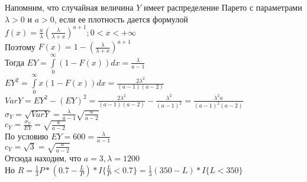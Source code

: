 \documentclass{article}
\begin{document}
Напомним, что случайная величина $Y$ имеет распределение Парето с параметрами $\lambda > 0$ и $a>0$, если ее плотность дается формулой\\

$f(x) = \frac{a}{\lambda} (\frac{\lambda}{\lambda+x})^{a+1}; 0<x< +\infty$\\

Поэтому $F(x) = 1 - (\frac{\lambda}{\lambda+x})^{a+1}$\\

Тогда $EY= \int\limits_{0}^{\infty} (1-F(x))dx = \frac{\lambda}{a-1}$\\

$EY^2= \int\limits_{0}^{\infty} x(1-F(x))dx = \frac{2\lambda^2}{(a-1)(a-2)}$\\

$VarY = EY^2-(EY)^2 = \frac{2\lambda^2}{(a-1)(a-2)} -  \frac{\lambda^2}{(a-1)^2} = \frac{\lambda^2 a }{(a-1)^2(a-2)} $\\

$\sigma_Y = \sqrt{VarY}=  \frac{\lambda}{a-1} \sqrt{ \frac{a}{a-2}} $\\

$c_Y = \frac {\sigma_Y}{EY} = \sqrt{  \frac{a}{a-2}}$\\

По условию $EY= 600=  \frac{\lambda}{a-1}$\\
$ c_Y=\sqrt{3} = \sqrt{  \frac{a}{a-2}}$\\

Отсюда находим, что $a=3, \lambda=1200$\\

Но $R= \frac{1}{3} P *  (0.7 - \frac{L}{P}) * I\{ \frac{L}{P} <0.7\} =  \frac{1}{3}   (350 - L) *  I\{ L < 350 \}$\\
\end{document}
